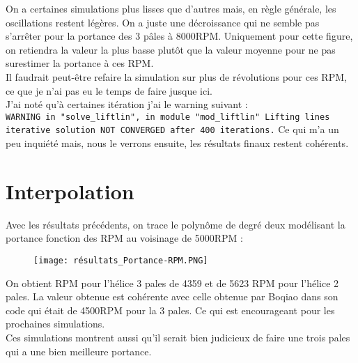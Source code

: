 \documentclass{article}
\begin{document}
On a certaines simulations plus lisses que d'autres mais, en règle générale, les oscillations restent légères. On a juste une décroissance qui ne semble pas s'arrêter pour la portance des 3 pâles à 8000RPM. Uniquement pour cette figure, on retiendra la valeur la plus basse plutôt que la valeur moyenne pour ne pas surestimer la portance à ces RPM.
\\ Il faudrait peut-être refaire la simulation sur plus de révolutions pour ces RPM, ce que je n'ai pas eu le temps de faire jusque ici.
\\ J'ai noté qu'à certaines itération j'ai le warning suivant : \\ \verb!WARNING in "solve_liftlin", in module "mod_liftlin" Lifting lines iterative solution NOT CONVERGED after 400 iterations.! Ce qui m'a un peu inquiété mais, nous le verrons ensuite, les résultats finaux restent cohérents. 
	\section{Interpolation}
	Avec les résultats précédents, on trace le polynôme de degré deux modélisant la portance fonction des RPM au voisinage de 5000RPM : \\
	\begin{figure}[h]
		\centering
		\texttt{[image: résultats\_Portance-RPM.PNG]}
		\label{fig:image}
	\end{figure}
	On obtient RPM pour l'hélice 3 pales de 4359 et de 5623 RPM pour l'hélice 2 pales.
	La valeur obtenue est cohérente avec celle obtenue par Boqiao dans son code qui était de 4500RPM pour la 3 pales. Ce qui est encourageant pour les prochaines simulations.\\Ces simulations montrent aussi qu'il serait bien judicieux de faire une trois pales qui a une bien meilleure portance.
\end{document}
